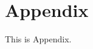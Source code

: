 \documentclass[./main]{subfiles}
\begin{document}
\section{Appendix}
This is Appendix.

\end{document}
